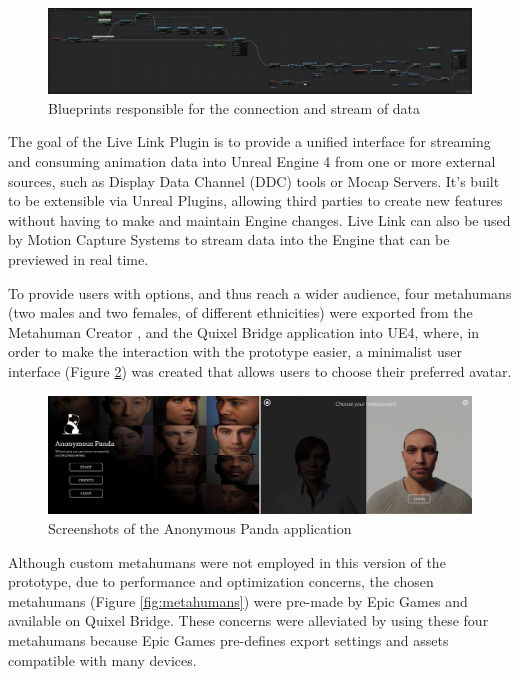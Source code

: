 \begin{figure}[!htb]
\includegraphics[width=\textwidth]{figures/hereItBegins.png}
\centering
\caption{Blueprints responsible for the connection and stream of data}
\label{fig:blueprintsData}
\end{figure}

The goal of the Live Link Plugin \cite{EPI22} is to provide a unified interface for streaming and consuming animation data into Unreal Engine 4 from one or more external sources, such as Display Data Channel (DDC) tools or Mocap Servers. It's built to be extensible via Unreal Plugins, allowing third parties to create new features without having to make and maintain Engine changes. Live Link can also be used by Motion Capture Systems to stream data into the Engine that can be previewed in real time.

To provide users with options, and thus reach a wider audience, four metahumans (two males and two females, of different ethnicities) were exported from the Metahuman Creator \cite{EPI21}, and the Quixel Bridge application into UE4, where, in order to make the interaction with the prototype easier, a minimalist user interface (Figure \ref{fig:screenshotApp}) was created that allows users to choose their preferred avatar. 

\begin{figure}[!htb]
\includegraphics[width=\textwidth]{figures/ui-app.jpg}
\centering
\caption{Screenshots of the Anonymous Panda application}
\label{fig:screenshotApp}
\end{figure}

Although custom metahumans were not employed in this version of the prototype, due to performance and optimization concerns, the chosen metahumans (Figure \ref{fig:metahumans}) were pre-made by Epic Games and available on Quixel Bridge. These concerns were alleviated by using these four metahumans because Epic Games pre-defines export settings and assets compatible with many devices.


